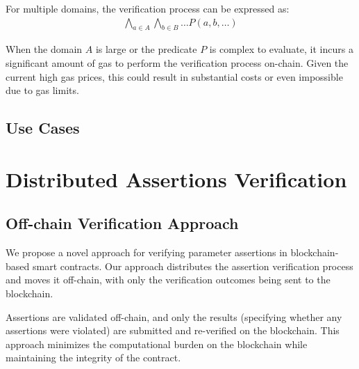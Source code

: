 \documentclass[runningheads]{llncs}
\begin{document}
For multiple domains, the verification process can be expressed as:
\begin{gather}
  \label{eq:4}
  \bigwedge_{a \in A} \bigwedge_{b \in B} \dots P(a, b, \dots)
\end{gather}

When the domain $A$ is large or the predicate $P$ is complex to evaluate, it incurs a significant amount of gas to perform the verification process on-chain.  Given the current high gas prices, this could result in substantial costs or even impossible due to gas limits. 
\subsection{Use Cases}

\section{Distributed Assertions Verification}
\label{sec:distributed-assertion-verification}
\subsection{Off-chain Verification Approach}
We propose a novel approach for verifying parameter assertions in blockchain-based smart contracts. Our approach distributes the assertion verification process and moves it off-chain, with only the verification outcomes being sent to the blockchain.

Assertions are validated off-chain, and only the results (specifying whether any assertions were violated) are submitted and re-verified on the blockchain. This approach minimizes the computational burden on the blockchain while maintaining the integrity of the contract.
\end{document}
